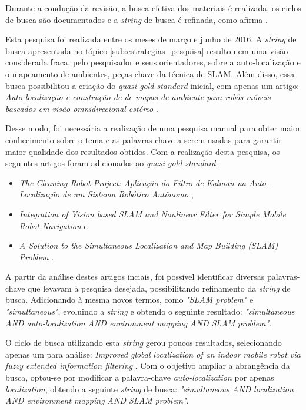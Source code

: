 		Durante a condução da revisão, a busca efetiva dos materiais é realizada, os ciclos de busca são documentados e a \textit{string} de busca é refinada, como afirma \cite{estudoPrimarioSecundario}.

		Esta pesquisa foi realizada entre os meses de março e junho de 2016. A \textit{string} de busca apresentada no tópico \ref{sub:estrategias_pesquisa} resultou em uma visão considerada fraca, pelo pesquisador e seus orientadores, sobre a auto-localização e o mapeamento de ambientes, peças chave da técnica de SLAM. Além disso, essa busca possibilitou a criação do \textit{quasi-gold standard} inicial, com apenas um artigo: \textit{Auto-localização e construção de de mapas de ambiente para robôs móveis baseados em visão omnidirecional estéreo} \cite{localizacaoEMapeamentoPaulo}. 

		Desse modo, foi necessária a realização de uma pesquisa manual para obter maior conhecimento sobre o tema e as palavras-chave a serem usadas para garantir maior qualidade dos resultados obtidos. Com a realização desta pesquisa, os seguintes artigos foram adicionados ao \textit{quasi-gold standard}:

		\begin{itemize}
			\item \textit{The Cleaning Robot Project: Aplicação do Filtro de Kalman na Auto-Localização de um Sistema Robótico Autônomo} \cite{theCleaningProject},
			\item \textit{Integration of Vision based SLAM and Nonlinear Filter for Simple Mobile Robot Navigation} \cite{integrationVisionSLAMnonlinear} e
			\item \textit{A Solution to the Simultaneous Localization and Map Building (SLAM) Problem} \cite{slamProblem}.
		\end{itemize}

		A partir da análise destes artigos inciais, foi possível identificar diversas palavras-chave que levavam à pesquisa desejada, possibilitando refinamento da \textit{string} de busca. Adicionando à mesma novos termos, como \textit{"SLAM problem"} e \textit{"simultaneous"}, evoluindo a \textit{string} e obtendo o seguinte resultado: \textit{"simultaneous AND auto-localization AND environment mapping AND SLAM problem"}.
		
		O ciclo de busca utilizando esta \textit{string} gerou poucos resultados, selecionando apenas um para análise: \textit{Improved global localization of an indoor mobile robot via fuzzy extended information filtering} \cite{ROB:1764504}. Com o objetivo ampliar a abrangência da busca, optou-se por modificar a palavra-chave \textit{auto-localization} por apenas \textit{localization}, obtendo a seguinte \textit{string} de busca: \textit{"simultaneous AND localization AND environment mapping AND SLAM problem"}.

